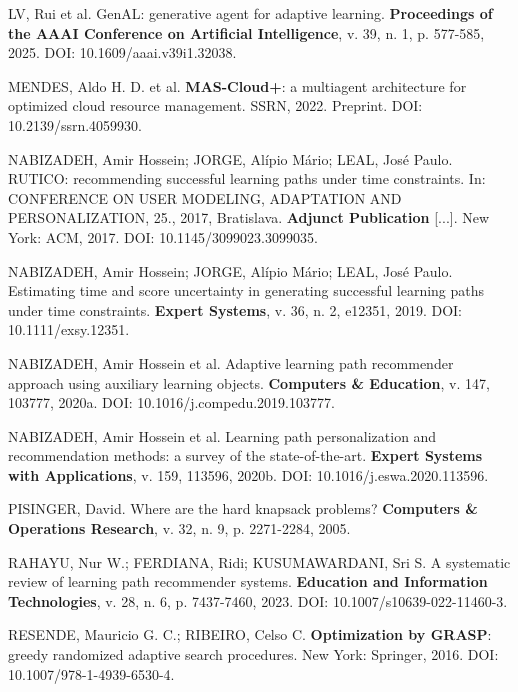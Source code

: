\documentclass[12pt,a4paper]{article}
\begin{document}
\begin{singlespace}
\noindent LV, Rui et al. GenAL: generative agent for adaptive learning. \textbf{Proceedings of the AAAI Conference on Artificial Intelligence}, v. 39, n. 1, p. 577-585, 2025. DOI: 10.1609/aaai.v39i1.32038.\par\vspace{1em}
\noindent MENDES, Aldo H. D. et al. \textbf{MAS-Cloud+}: a multiagent architecture for optimized cloud resource management. SSRN, 2022. Preprint. DOI: 10.2139/ssrn.4059930.\par\vspace{1em}
\noindent NABIZADEH, Amir Hossein; JORGE, Alípio Mário; LEAL, José Paulo. RUTICO: recommending successful learning paths under time constraints. In: CONFERENCE ON USER MODELING, ADAPTATION AND PERSONALIZATION, 25., 2017, Bratislava. \textbf{Adjunct Publication} [...]. New York: ACM, 2017. DOI: 10.1145/3099023.3099035.\par\vspace{1em}
\noindent NABIZADEH, Amir Hossein; JORGE, Alípio Mário; LEAL, José Paulo. Estimating time and score uncertainty in generating successful learning paths under time constraints. \textbf{Expert Systems}, v. 36, n. 2, e12351, 2019. DOI: 10.1111/exsy.12351.\par\vspace{1em}
\noindent NABIZADEH, Amir Hossein et al. Adaptive learning path recommender approach using auxiliary learning objects. \textbf{Computers \& Education}, v. 147, 103777, 2020a. DOI: 10.1016/j.compedu.2019.103777.\par\vspace{1em}
\noindent NABIZADEH, Amir Hossein et al. Learning path personalization and recommendation methods: a survey of the state-of-the-art. \textbf{Expert Systems with Applications}, v. 159, 113596, 2020b. DOI: 10.1016/j.eswa.2020.113596.\par\vspace{1em}
\noindent PISINGER, David. Where are the hard knapsack problems? \textbf{Computers \& Operations Research}, v. 32, n. 9, p. 2271-2284, 2005.\par\vspace{1em}
\noindent RAHAYU, Nur W.; FERDIANA, Ridi; KUSUMAWARDANI, Sri S. A systematic review of learning path recommender systems. \textbf{Education and Information Technologies}, v. 28, n. 6, p. 7437-7460, 2023. DOI: 10.1007/s10639-022-11460-3.\par\vspace{1em}
\noindent RESENDE, Mauricio G. C.; RIBEIRO, Celso C. \textbf{Optimization by GRASP}: greedy randomized adaptive search procedures. New York: Springer, 2016. DOI: 10.1007/978-1-4939-6530-4.\par\vspace{1em}

\end{singlespace}
\end{document}
